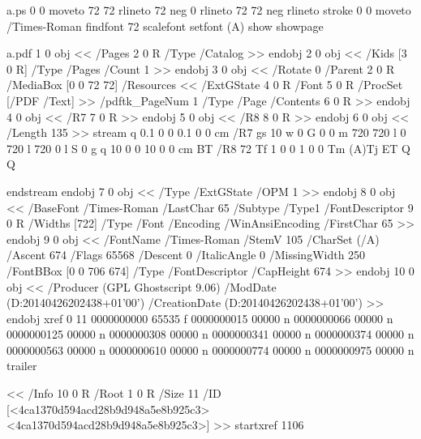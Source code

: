 
\begin{filecontents*}{a.ps}
0 0 moveto
72 72 rlineto
72 neg 0 rlineto
72 72 neg rlineto
stroke
0 0 moveto
/Times-Roman findfont
72 scalefont
setfont
(A) show
showpage
\end{filecontents*}
\begin{filecontents*}{a.pdf}
1 0  obj
<<
/Pages 2 0 R
/Type /Catalog
>>
 endobj
2 0  obj
<<
/Kids [3 0 R]
/Type /Pages
/Count 1
>>
 endobj
3 0  obj
<<
/Rotate 0
/Parent 2 0 R
/MediaBox [0 0 72 72]
 /Resources
<<
/ExtGState 4 0 R
/Font 5 0 R
/ProcSet [/PDF /Text]
>>
/pdftk_PageNum 1
/Type /Page
/Contents 6 0 R
>>
 endobj
4 0  obj
<<
/R7 7 0 R
>>
 endobj
5 0  obj
<<
/R8 8 0 R
>>
 endobj
6 0  obj
<<
/Length 135
>>
stream
q 0.1 0 0 0.1 0 0 cm
/R7 gs
10 w
0 G
0 0 m
720 720 l
0 720 l
720 0 l
S
0 g
q
10 0 0 10 0 0 cm BT
/R8 72 Tf
1 0 0 1 0 0 Tm
(A)Tj
ET
Q
Q

 endstream
 endobj
7 0  obj
<<
/Type /ExtGState
/OPM 1
>>
 endobj
8 0  obj
<<
/BaseFont /Times-Roman
/LastChar 65
/Subtype /Type1
/FontDescriptor 9 0 R
/Widths [722]
/Type /Font
/Encoding /WinAnsiEncoding
/FirstChar 65
>>
 endobj
9 0  obj
<<
/FontName /Times-Roman
/StemV 105
/CharSet (/A)
/Ascent 674
/Flags 65568
/Descent 0
/ItalicAngle 0
/MissingWidth 250
/FontBBox [0 0 706 674]
/Type /FontDescriptor
/CapHeight 674
>>
 endobj
10 0  obj
<<
/Producer (GPL Ghostscript 9.06)
/ModDate (D:20140426202438+01'00')
/CreationDate (D:20140426202438+01'00')
>>
endobj xref
0 11
0000000000 65535  f
0000000015 00000  n
0000000066 00000  n
0000000125 00000  n
0000000308 00000  n
0000000341 00000  n
0000000374 00000  n
0000000563 00000  n
0000000610 00000  n
0000000774 00000  n
0000000975 00000  n
trailer

<<
/Info 10 0 R
/Root 1 0 R
/Size 11
/ID [<4ca1370d594acd28b9d948a5e8b925c3> <4ca1370d594acd28b9d948a5e8b925c3>]
>>
startxref
1106
\end{filecontents*}
\documentclass{ltxguide}

\usepackage{color,graphicx,shortvrb}

